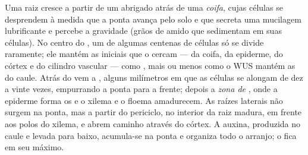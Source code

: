 \begin{proposition}\label{prop:b2:plant-meristems:ram}
Uma raiz cresce a partir de um  abrigado atrás de uma
\emph{coifa}, cujas células se desprendem à medida que a ponta avança
pelo solo e que secreta uma mucilagem lubrificante e percebe a
gravidade (grãos de amido que sedimentam em suas células). No centro do
, um \emph{} de algumas centenas de células
só se divide raramente; ele mantém as iniciais que o cercam --- da
coifa, da epiderme, do córtex e do cilindro vascular --- como
, mais ou menos como o WUS mantém as do caule. Atrás do
 vem a \emph{}, alguns milímetros em que as
células se alongam de dez a vinte vezes, empurrando a ponta para a
frente; depois a \emph{zona de }, onde a epiderme forma os
\emph{} e o xilema e o floema amadurecem. As raízes
laterais não surgem na ponta, mas a partir do periciclo, no interior da
raiz madura, em frente aos polos do xilema, e abrem caminho através do
córtex. A auxina, produzida no caule e levada para baixo, acumula-se na
ponta e organiza todo o arranjo; o  fica em seu
máximo.
\end{proposition}

